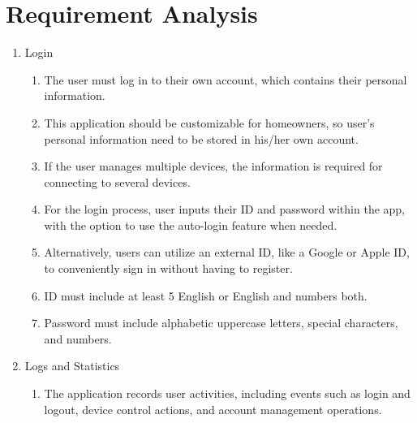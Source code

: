 \section{\Large{Requirement Analysis}}
\begin{enumerate}[label=\arabic*.]
    \item {\large{Login}}\\

    \begin{enumerate}[label*={\arabic*.},ref=\theenumi.\arabic*]
    \setlength{\itemindent}{0.5cm}
        \item The user must log in to their own account, which contains their personal information.\\
        
        \item This application should be customizable for homeowners, so user’s personal information need to be stored in his/her own account.\\
        
        \item If the user manages multiple devices, the information is required for connecting to several devices.\\
        
        
        \item For the login process, user inputs their ID and password within the app, with the option to use the auto-login feature when needed.\\
        
        \item Alternatively, users can utilize an external ID, like a Google or Apple ID, to conveniently sign in without having to register.\\
    
        \item ID must include at least 5 English or English and numbers both.\\
    
        \item Password must include alphabetic uppercase letters, special characters, and numbers.\\
    \end{enumerate}

    \item {\large{Logs and Statistics}}\\
    \begin{enumerate}[label*={\arabic*.},ref=\theenumi.\arabic*]
    \setlength{\itemindent}{0.5cm}
        \item The application records user activities, including events such as login and logout, device control actions, and account management operations. \\
        

\end{enumerate}
\end{enumerate}
